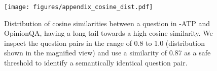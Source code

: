 \begin{figure}[!t]
    \captionsetup{font=small}
    \texttt{[image: figures/appendix\_cosine\_dist.pdf]}
    \vspace{-15pt}
    \caption{
    Distribution of cosine similarities between a question in \OURDATA-ATP and OpinionQA, having a long tail towards a high cosine similarity.
    We inspect the question pairs in the range of 0.8 to 1.0 (distribution shown in the magnified view) and use a similarity of 0.87 as a safe threshold to identify a semantically identical question pair.
    }
    \label{fig:cosine_sim_distribution}
    \vspace{-5pt}
\end{figure}
